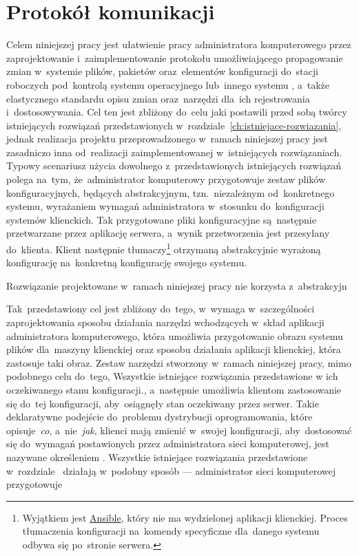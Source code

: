 \documentclass[thesis]{subfiles}
\begin{document}
\chapter{Protokół komunikacji}

Celem niniejszej pracy jest ułatwienie pracy administratora komputerowego przez zaprojektowanie i~zaimplementowanie protokołu umożliwiającego propagowanie zmian w~systemie plików, pakietów oraz~elementów konfiguracji do~stacji roboczych pod~kontrolą systemu operacyjnego  lub~innego systemu , a~także elastycznego standardu opisu zmian oraz~narzędzi dla~ich rejestrowania i~dostosowywania. Cel ten jest zbliżony do~celu jaki postawili przed sobą twórcy istniejących rozwiązań przedstawionych w~rozdziale~\ref{ch:istniejace-rozwiazania}, jednak realizacja projektu przeprowadzonego w~ramach niniejszej pracy jest zasadniczo inna od~realizacji zaimplementowanej w~istniejących rozwiązaniach. Typowy scenariusz użycia dowolnego z~przedstawionych istniejących rozwiązań polega na~tym, że~administrator komputerowy przygotowuje zestaw plików konfiguracyjnych, będących abstrakcyjnym, tzn.~niezależnym od~konkretnego systemu, wyrażaniem wymagań administratora w~stosunku do~konfiguracji systemów klienckich. Tak przygotowane pliki konfiguracyjne są~następnie przetwarzane przez aplikację serwera, a~wynik przetworzenia jest przesyłany do~klienta. Klient następnie tłumaczy\footnote{Wyjątkiem jest \hyperref[sec:ansible]{Ansible}, który nie ma wydzielonej aplikacji klienckiej. Proces tłumaczenia konfiguracji na~komendy specyficzne dla~danego systemu odbywa się po~stronie serwera.} otrzymaną abstrakcyjnie wyrażoną konfigurację na~konkretną konfigurację swojego systemu.

Rozwiązanie projektowane w~ramach niniejszej pracy nie korzysta z~abstrakcyjn

Tak~przedstawiony cel jest zbliżony do~tego, w~wymaga w~szczególności zaprojektowania sposobu działania narzędzi wchodzących w~skład aplikacji administratora komputerowego, która umożliwia przygotowanie obrazu systemu plików dla~maszyny klienckiej oraz sposobu działania aplikacji klienckiej, która zastosuje taki obraz. Zestaw narzędzi stworzony w~ramach niniejszej pracy, mimo podobnego celu do~tego, Wszystkie istniejące rozwiązania przedstawione w  ich oczekiwanego stanu konfiguracji., a~następnie umożliwia klientom zastosowanie się do~tej konfiguracji, aby~osiągnęły stan oczekiwany przez serwer. Takie deklaratywne podejście do~problemu dystrybucji oprogramowania, które opisuje~\emph{co}, a~nie~\emph{jak}, klienci mają zmienić w~swojej konfiguracji, aby~dostosować się do~wymagań postawionych przez administratora sieci komputerowej, jest nazywane określeniem .
Wszystkie istniejące rozwiązania przedstawione w~rozdziale~ działają w~podobny sposób --- administrator sieci komputerowej przygotowuje
\end{document}
